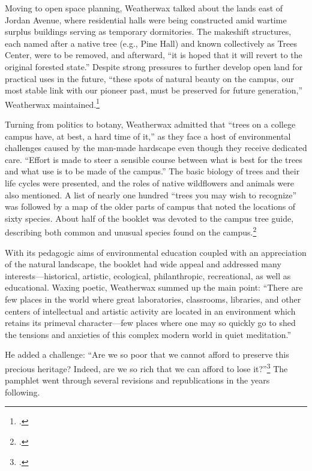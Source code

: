 \documentclass[
  american,
  letterpaper,
]{scrreprt}
\begin{document}
Moving to open space planning, Weatherwax talked about the lands east of
Jordan Avenue, where residential halls were being constructed amid
wartime surplus buildings serving as temporary dormitories. The
makeshift structures, each named after a native tree (e.g., Pine Hall)
and known collectively as Trees Center, were to be removed, and
afterward, ``it is hoped that it will revert to the original forested
state.'' Despite strong pressures to further develop open land for
practical uses in the future, ``these spots of natural beauty on the
campus, our most stable link with our pioneer past, must be preserved
for future generation,'' Weatherwax maintained.\footnote{.}

Turning from politics to botany, Weatherwax admitted that ``trees on a
college campus have, at best, a hard time of it,'' as they face a host
of environmental challenges caused by the man-made hardscape even though
they receive dedicated care. ``Effort is made to steer a sensible course
between what is best for the trees and what use is to be made of the
campus.'' The basic biology of trees and their life cycles were
presented, and the roles of native wildflowers and animals were also
mentioned. A list of nearly one hundred ``trees you may wish to
recognize'' was followed by a map of the older parts of campus that
noted the locations of sixty species. About half of the booklet was
devoted to the campus tree guide, describing both common and unusual
species found on the campus.\footnote{.}

With its pedagogic aims of environmental education coupled with an
appreciation of the natural landscape, the booklet had wide appeal and
addressed many interests---historical, artistic, ecological,
philanthropic, recreational, as well as educational. Waxing poetic,
Weatherwax summed up the main point: ``There are few places in the world
where great laboratories, classrooms, libraries, and other centers of
intellectual and artistic activity are located in an environment which
retains its primeval character---few places where one may so quickly go
to shed the tensions and anxieties of this complex modern world in quiet
meditation.''

He added a challenge: ``Are we so poor that we cannot afford to preserve
this precious heritage? Indeed, are we so rich that we can afford to
lose it?''\footnote{.} The
pamphlet went through several revisions and republications in the years
following.
\end{document}
